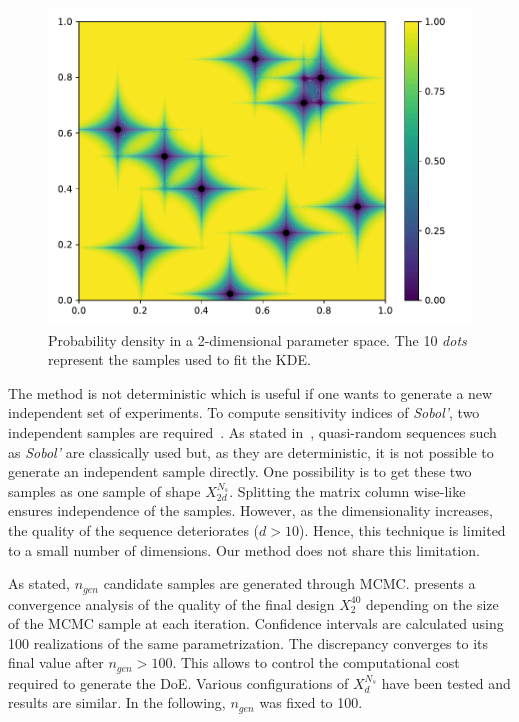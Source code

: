 \begin{figure}[!h]
\centering
\includegraphics[width=0.9\linewidth,keepaspectratio]{fig/contributions/doe/10_star.pdf}
\caption{Probability density in a 2-dimensional parameter space. The 10 \emph{dots} represent the samples used to fit the KDE.}
\label{fig:star}
\end{figure}

The method is not deterministic which is useful if one wants to generate a new independent set of experiments. To compute sensitivity indices of \emph{Sobol'}, two independent samples are required~\citep{Saltelli2010}. As stated in~\citep{Saltelli2010}, quasi-random sequences such as \emph{Sobol'} are classically used but, as they are deterministic, it is not possible to generate an independent sample directly. One possibility is to get these two samples as one sample of shape $X_{2d}^{N_s}$. Splitting the matrix column wise-like ensures independence of the samples. However, as the dimensionality increases, the quality of the sequence deteriorates ($d > 10$). Hence, this technique is limited to a small number of dimensions. Our method does not share this limitation.

As stated, $n_{gen}$ candidate samples are generated through MCMC.  presents a convergence analysis of the quality of the final design $X_2^{40}$ depending on the size of the MCMC sample at each iteration. Confidence intervals are calculated using 100 realizations of the same parametrization. The discrepancy converges to its final value after $n_{gen}>100$. This allows to control the computational cost required to generate the DoE. Various configurations of $X_d^{N_s}$ have been tested and results are similar. In the following, $n_{gen}$ was fixed to 100.

